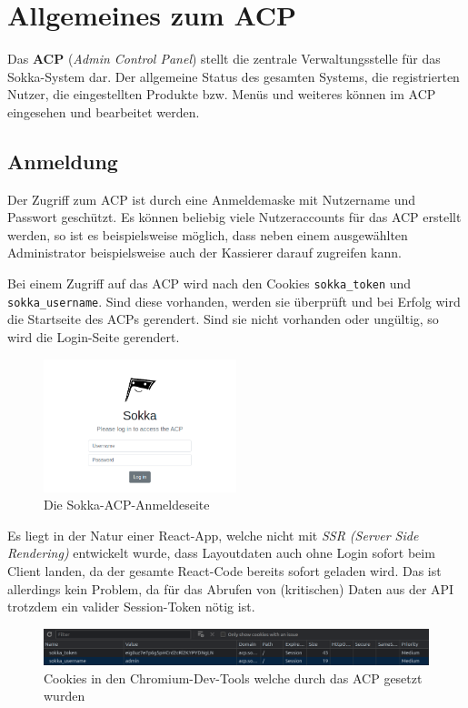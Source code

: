 \chapter{Allgemeines zum ACP}

Das \textbf{ACP} (\textit{Admin Control Panel}) stellt die zentrale Verwaltungsstelle für das Sokka-System dar. Der allgemeine Status des gesamten Systems, die registrierten Nutzer, die eingestellten Produkte bzw. Menüs und weiteres können im ACP eingesehen und bearbeitet werden.

\section{Anmeldung}
\label{acp-anmeldung}

Der Zugriff zum ACP ist durch eine Anmeldemaske mit Nutzername und Passwort geschützt. Es können beliebig viele Nutzeraccounts für das ACP erstellt werden, so ist es beispielsweise möglich, dass neben einem ausgewählten Administrator beispielsweise auch der Kassierer darauf zugreifen kann.

Bei einem Zugriff auf das ACP wird nach den Cookies \lstinline{sokka_token} und \lstinline{sokka_username}. Sind diese vorhanden, werden sie überprüft und bei Erfolg wird die Startseite des ACPs gerendert. Sind sie nicht vorhanden oder ungültig, so wird die Login-Seite gerendert.

\begin{figure}[ht]
    \centering
    \includegraphics[width=0.5\textwidth]{images/ACP/login.png}
    \caption{Die Sokka-ACP-Anmeldeseite}
\end{figure}

Es liegt in der Natur einer React-App, welche nicht mit \textit{SSR (Server Side Rendering)} entwickelt wurde, dass Layoutdaten auch ohne Login sofort beim Client landen, da der gesamte React-Code bereits sofort geladen wird. Das ist allerdings kein Problem, da für das Abrufen von (kritischen) Daten aus der API trotzdem ein valider Session-Token nötig ist.

\begin{figure}[ht]
    \centering
    \includegraphics[width=1\textwidth]{images/ACP/cookies.png}
    \caption{Cookies in den Chromium-Dev-Tools welche durch das ACP gesetzt wurden}
\end{figure}

